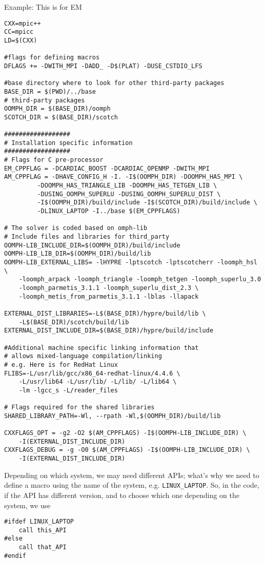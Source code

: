 Example: This is for EM
\begin{verbatim}
CXX=mpic++
CC=mpicc
LD=$(CXX)

#flags for defining macros
DFLAGS += -DWITH_MPI -DADD_ -D$(PLAT) -DUSE_CSTDIO_LFS

#base directory where to look for other third-party packages
BASE_DIR = $(PWD)/../base
# third-party packages
OOMPH_DIR = $(BASE_DIR)/oomph
SCOTCH_DIR = $(BASE_DIR)/scotch

##################
# Installation specific information
##################
# Flags for C pre-processor
EM_CPPFLAG = -DCARDIAC_BOOST -DCARDIAC_OPENMP -DWITH_MPI
AM_CPPFLAG = -DHAVE_CONFIG_H -I. -I$(OOMPH_DIR) -DOOMPH_HAS_MPI \
         -DOOMPH_HAS_TRIANGLE_LIB -DOOMPH_HAS_TETGEN_LIB \
         -DUSING_OOMPH_SUPERLU -DUSING_OOMPH_SUPERLU_DIST \
         -I$(OOMPH_DIR)/build/include -I$(SCOTCH_DIR)/build/include \
         -DLINUX_LAPTOP -I../base $(EM_CPPFLAGS)
         
# The solver is coded based on omph-lib         
# Include files and libraries for third_party
OOMPH-LIB_INCLUDE_DIR=$(OOMPH_DIR)/build/include
OOMPH-LIB_LIB_DIR=$(OOMPH_DIR)/build/lib
OOMPH-LIB_EXTERNAL_LIBS= -lHYPRE -lptscotch -lptscotcherr -loomph_hsl \
	-loomph_arpack -loomph_triangle -loomph_tetgen -loomph_superlu_3.0
	-loomph_parmetis_3.1.1 -loomph_superlu_dist_2.3 \
	-loomph_metis_from_parmetis_3.1.1 -lblas -llapack

EXTERNAL_DIST_LIBRARIES=-L$(BASE_DIR)/hypre/build/lib \
 	-L$(BASE_DIR)/scotch/build/lib
EXTERNAL_DIST_INCLUDE_DIR=$(BASE_DIR)/hypre/build/include

#Additional machine specific linking information that
# allows mixed-language compilation/linking
# e.g. Here is for RedHat Linux
FLIBS=-L/usr/lib/gcc/x86_64-redhat-linux/4.4.6 \
	-L/usr/lib64 -L/usr/lib/ -L/lib/ -L/lib64 \
	-lm -lgcc_s -L/reader_files
	
# Flags required for the shared libraries
SHARED_LIBRARY_PATH=-Wl, --rpath -Wl,$(OOMPH_DIR)/build/lib

CXXFLAGS_OPT = -g2 -O2 $(AM_CPPFLAGS) -I$(OOMPH-LIB_INCLUDE_DIR) \
	-I(EXTERNAL_DIST_INCLUDE_DIR)
CXXFLAGS_DEBUG = -g -O0 $(AM_CPPFLAGS) -I$(OOMPH-LIB_INCLUDE_DIR) \
	-I(EXTERNAL_DIST_INCLUDE_DIR)
\end{verbatim}
Depending on which system, we may need different APIs; what's why we need to
define a macro using the name of the system, e.g. \verb!LINUX_LAPTOP!. So, in
the code, if the API has different version, and to choose which one depending
on the system, we use 
\begin{verbatim}
#ifdef LINUX_LAPTOP
    call this_API
#else 
    call that_API
#endif
\end{verbatim}

